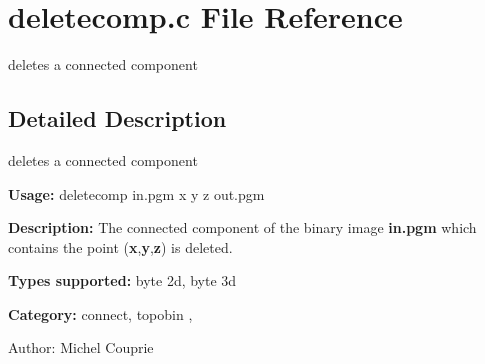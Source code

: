 \section{deletecomp.c File Reference}
\label{deletecomp_8c}
deletes a connected component 



\subsection{Detailed Description}
deletes a connected component 

{\bf Usage:} deletecomp in.pgm x y z out.pgm

{\bf Description:} The connected component of the binary image {\bf in.pgm} which contains the point ({\bf x},{\bf y},{\bf z}) is deleted.

{\bf Types supported:} byte 2d, byte 3d

{\bf Category:} connect, topobin ,

\begin{Desc}
\item[Author:]Michel Couprie \end{Desc}

